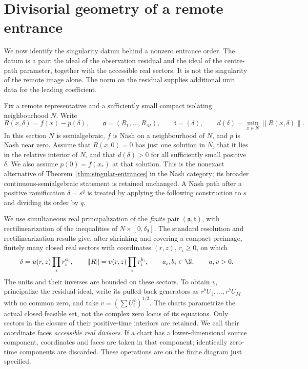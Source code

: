 \section{Divisorial geometry of a remote entrance}\label{sec:v101-divisors}
We now identify the singularity datum behind a nonzero entrance order.
The datum is a pair: the ideal of the observation residual and the
ideal of the centre-path parameter, together with the accessible real
sectors. It is not the singularity of the remote image alone. The norm
on the residual supplies additional unit data for the leading coefficient.

Fix a remote representative and a sufficiently small compact isolating
neighbourhood $N$. Write
\[
 R(x,\delta)=f(x)-p(\delta),\qquad
 \mathfrak a=(R_1,\ldots,R_M),\qquad \mathfrak t=(\delta),\qquad
 d(\delta)=\min_{x\in N}\|R(x,\delta)\|.
\]
In this section $N$ is semialgebraic, $f$ is Nash on a neighbourhood
of $N$, and $p$ is Nash near zero. Assume that $R(x,0)=0$ has just
one solution in $N$, that it lies in the relative interior of $N$,
and that $d(\delta)>0$ for all sufficiently small positive $\delta$.
We also assume $p(0)=f(x_*)$ at that solution. This is the nonexact
alternative of Theorem~\ref{thm:singular-entrances} in the Nash category;
its broader continuous-semialgebraic statement is retained unchanged.
A Nash path after a positive ramification $\delta=s^q$ is treated by
applying the following construction to $s$ and dividing its order by $q$.

We use simultaneous real principalization of the \emph{finite} pair
$(\mathfrak a,\mathfrak t)$, with rectilinearization of the inequalities
of $N\times[0,\delta_0]$. The standard resolution and
rectilinearization results \cite{BM88,BM97} give, after shrinking and
covering a compact preimage, finitely many closed real sectors with
coordinates $(r,z)$, $r_i\ge0$, on which
\begin{equation}\label{eq:v101-monomial-pair}
 \delta=u(r,z)\prod_i r_i^{a_i},\qquad
 \|R\|=v(r,z)\prod_i r_i^{b_i},
 \qquad a_i,b_i\in\N,\qquad u,v>0.
\end{equation}
The units and their inverses are bounded on these sectors. To obtain
$v$, principalize the residual ideal, write its pulled-back generators
as $r^b U_1,\ldots,r^b U_M$ with no common zero, and take
$v=(\sum U_i^2)^{1/2}$. The charts parametrize the actual closed
feasible set, not the complex zero locus of its equations. Only sectors
in the closure of their positive-time interiors are retained.
We call their coordinate faces \emph{accessible real divisors}.
If a chart has a lower-dimensional source component, coordinates and
faces are taken in that component; identically zero-time components
are discarded. These operations are on the finite diagram just specified.

